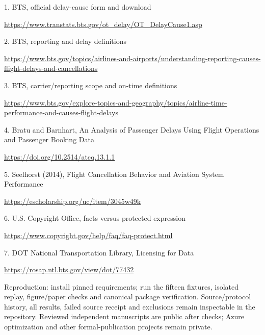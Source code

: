 \documentclass[11pt]{article}
\begin{document}
\small
1. BTS, official delay-cause form and download\par\url{https://www.transtats.bts.gov/ot_delay/OT_DelayCause1.asp}\par
2. BTS, reporting and delay definitions\par\url{https://www.bts.gov/topics/airlines-and-airports/understanding-reporting-causes-flight-delays-and-cancellations}\par
3. BTS, carrier/reporting scope and on-time definitions\par\url{https://www.bts.gov/explore-topics-and-geography/topics/airline-time-performance-and-causes-flight-delays}\par
4. Bratu and Barnhart, An Analysis of Passenger Delays Using Flight Operations and Passenger Booking Data\par\url{https://doi.org/10.2514/atcq.13.1.1}\par
5. Seelhorst (2014), Flight Cancellation Behavior and Aviation System Performance\par\url{https://escholarship.org/uc/item/3045w49k}\par
6. U.S. Copyright Office, facts versus protected expression\par\url{https://www.copyright.gov/help/faq/faq-protect.html}\par
7. DOT National Transportation Library, Licensing for Data\par\url{https://rosap.ntl.bts.gov/view/dot/77432}\par
\normalsize\par
Reproduction: install pinned requirements; run the fifteen fixtures, isolated replay, figure/paper checks and canonical package verification. Source/protocol history, all results, failed source receipt and exclusions remain inspectable in the repository. Reviewed independent manuscripts are public after checks; Azure optimization and other formal-publication projects remain private.
\end{document}
